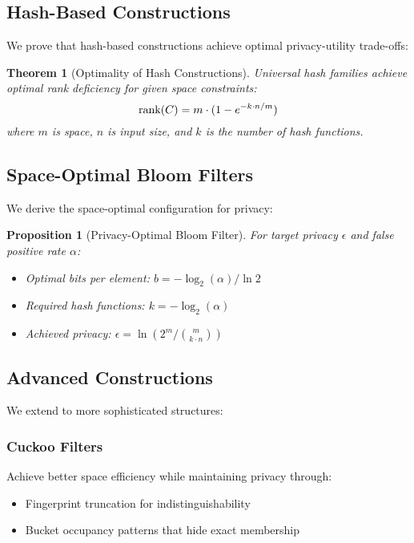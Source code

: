 \documentclass[11pt]{article}
\newtheorem{theorem}{Theorem}
\newtheorem{proposition}{Proposition}
\begin{document}
\subsection{Hash-Based Constructions}

We prove that hash-based constructions achieve optimal privacy-utility trade-offs:

\begin{theorem}[Optimality of Hash Constructions]
Universal hash families achieve optimal rank deficiency for given space constraints:
$$\text{rank}(C) = m \cdot (1 - e^{-k \cdot n / m})$$
where $m$ is space, $n$ is input size, and $k$ is the number of hash functions.
\end{theorem}

\subsection{Space-Optimal Bloom Filters}

We derive the space-optimal configuration for privacy:

\begin{proposition}[Privacy-Optimal Bloom Filter]
For target privacy $\epsilon$ and false positive rate $\alpha$:
\begin{itemize}
\item Optimal bits per element: $b = -\log_2(\alpha) / \ln 2$
\item Required hash functions: $k = -\log_2(\alpha)$
\item Achieved privacy: $\epsilon = \ln(2^m / \binom{m}{k \cdot n})$
\end{itemize}
\end{proposition}

\subsection{Advanced Constructions}

We extend to more sophisticated structures:

\subsubsection{Cuckoo Filters}
Achieve better space efficiency while maintaining privacy through:
\begin{itemize}
\item Fingerprint truncation for indistinguishability
\item Bucket occupancy patterns that hide exact membership
\end{itemize}
\end{document}
